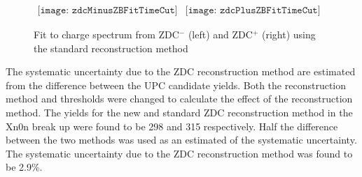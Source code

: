       \begin{figure}[!Hhtb]
        \centering
        $ \begin{array}{cc}
          \texttt{[image: zdcMinusZBFitTimeCut]} &
          \texttt{[image: zdcPlusZBFitTimeCut]}
        \end{array} $
        \caption{Fit to charge spectrum from ZDC$^{-}$ (left) and ZDC$^{+}$ 
          (right) using the standard reconstruction method}
        \label{fig:zdcM1Fit}
      \end{figure}

      The systematic uncertainty due to the ZDC reconstruction method are
        estimated from the difference between the UPC \JPsi{} candidate yields.
      Both the reconstruction method and thresholds were changed to calculate 
        the effect of the reconstruction method.
      The yields for the new and standard ZDC reconstruction method in the Xn0n
        break up were found to be 298 and 315 respectively. 
      Half the difference between the two methods was used as an estimated of 
        the systematic uncertainty.
      The systematic uncertainty due to the ZDC reconstruction method was 
        found to be 2.9\%.

